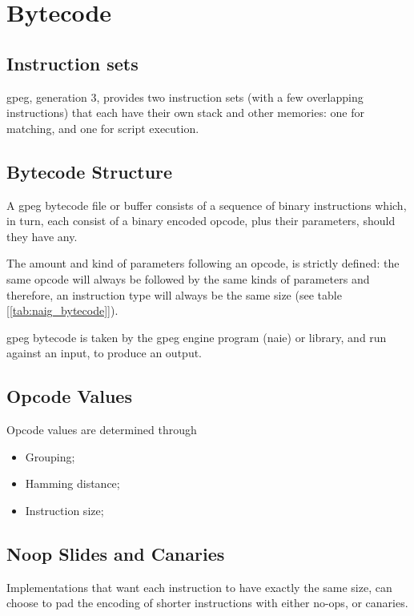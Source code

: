 \section{Bytecode}
\label{sec:bytecode}

\subsection{Instruction sets}

gpeg, generation 3, provides two instruction sets (with a few overlapping
instructions) that each have their own stack and other memories:
one for matching, and one for script execution.



\subsection{Bytecode Structure}

A gpeg bytecode file or buffer consists of a sequence of binary
instructions which, in turn, each consist of a binary
encoded opcode, plus their parameters, should they have any.

The amount and kind of parameters following an opcode, is strictly
defined:
the same opcode will always be followed by the same kinds of parameters
and therefore, an instruction type will always be the same size
(see table [\ref{tab:naig_bytecode}]).

gpeg bytecode is taken by the gpeg engine program (naie) or
library, and run against an input, to produce an output.

\subsection{Opcode Values}

Opcode values are determined through

\begin{itemize}
\item Grouping; 
\item Hamming distance;
\item Instruction size;
\end{itemize}

\subsection{Noop Slides and Canaries}

Implementations that want each instruction to have exactly the
same size, can choose to pad the encoding of shorter instructions
with either no-ops, or canaries.

